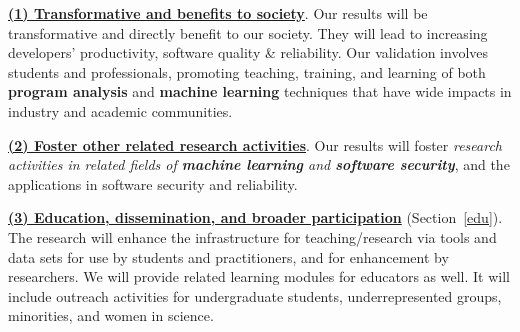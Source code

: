 \underline{{\bf (1) Transformative and benefits to society}}. Our
results will be transformative and directly benefit to our society.
They will lead to increasing developers' productivity, software
quality \& reliability.  Our validation involves students and
professionals, promoting teaching, training, and learning of both {\bf
  program analysis} and {\bf machine learning} techniques that
have wide impacts in industry and academic communities.

\noindent\underline{{\bf (2) Foster other related research
    activities}}. Our results will foster {\em research activities in
  related fields of {\bf machine learning} and {\bf software security}},
and the applications in software security and reliability.



\noindent\underline{{\bf (3) Education, dissemination, and broader participation}} (Section~\ref{edu}). The
research will enhance the infrastructure for teaching/research via
tools and data sets for use by students and practitioners, and for
enhancement by researchers. We will provide related learning
modules for educators as well. It will include outreach activities for
undergraduate students, underrepresented groups, minorities, and women
in science.


